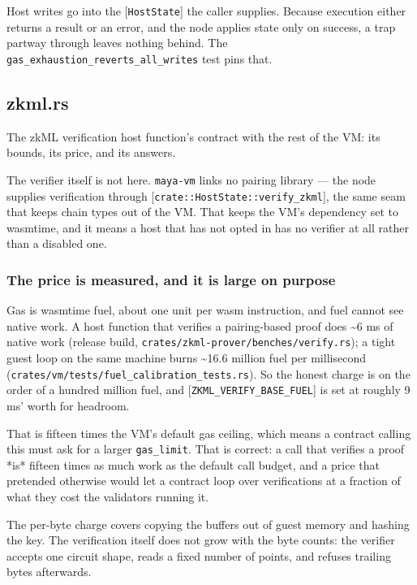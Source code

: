 \documentclass[11pt,a4paper]{article}
\begin{document}
Host writes go into the [\texttt{HostState}] the caller supplies. Because execution
either returns a result or an error, and the node applies state only on
success, a trap partway through leaves nothing behind. The
\texttt{gas\_exhaustion\_reverts\_all\_writes} test pins that.

\subsection{zkml.rs}
The zkML verification host function's contract with the rest of the VM:
its bounds, its price, and its answers.

The verifier itself is not here. \texttt{maya-vm} links no pairing library — the
node supplies verification through [\texttt{crate::HostState::verify\_zkml}], the
same seam that keeps chain types out of the VM. That keeps the VM's
dependency set to wasmtime, and it means a host that has not opted in has
no verifier at all rather than a disabled one.

\subsubsection{The price is measured, and it is large on purpose}

Gas is wasmtime fuel, about one unit per wasm instruction, and fuel cannot
see native work. A host function that verifies a pairing-based proof does
\textasciitilde{}6 ms of native work (release build, \texttt{crates/zkml-prover/benches/verify.rs}); a tight
guest loop on the same machine burns \textasciitilde{}16.6 million fuel per millisecond
(\texttt{crates/vm/tests/fuel\_calibration\_tests.rs}). So the honest charge is on the order
of a hundred million fuel, and [\texttt{ZKML\_VERIFY\_BASE\_FUEL}] is set at roughly
9 ms' worth for headroom.

That is fifteen times the VM's default gas ceiling, which means a contract
calling this must ask for a larger \texttt{gas\_limit}. That is correct: a call that
verifies a proof *is* fifteen times as much work as the default call budget,
and a price that pretended otherwise would let a contract loop over
verifications at a fraction of what they cost the validators running it.

The per-byte charge covers copying the buffers out of guest memory and
hashing the key. The verification itself does not grow with the byte
counts: the verifier accepts one circuit shape, reads a fixed number of
points, and refuses trailing bytes afterwards.
\end{document}

